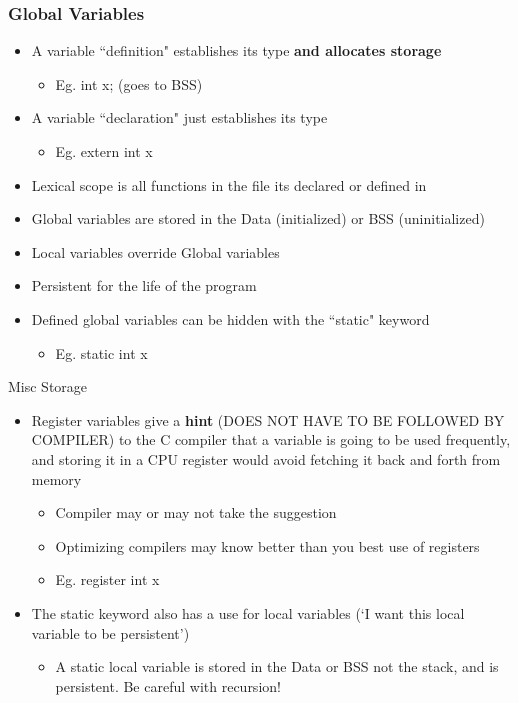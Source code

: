 \subsubsection{Global Variables}
\begin{itemize}
    \item A variable ``definition" establishes its type\textbf{ and allocates storage}
    \begin{itemize}
        \item Eg. int x; (goes to BSS)
    \end{itemize}
    \item A variable ``declaration" just establishes its type
    \begin{itemize}
        \item Eg. extern int x
    \end{itemize}
    \item Lexical scope is all functions in the file its declared or defined in
    \item Global variables are stored in the Data (initialized) or BSS (uninitialized)
    \item Local variables override Global variables
    \item Persistent for the life of the program
    \item Defined global variables can be hidden with the ``static" keyword
    \begin{itemize}
        \item Eg. static int x
    \end{itemize}
\end{itemize}
Misc Storage
\begin{itemize}
    \item Register variables give a \textbf{hint} (DOES NOT HAVE TO BE FOLLOWED BY COMPILER) to the C compiler that a variable is going to be used frequently, and storing it in a CPU register would avoid fetching it back and forth from memory
    \begin{itemize}
        \item Compiler may or may not take the suggestion
        \item Optimizing compilers may know better than you best use of registers
        \item Eg. register int x
    \end{itemize}
    \item The static keyword also has a use for local variables (`I want this local variable to be persistent')
    \begin{itemize}
        \item A static local variable is stored in the Data or BSS not the stack, and is persistent. Be careful with recursion!
    \end{itemize}
\end{itemize}

